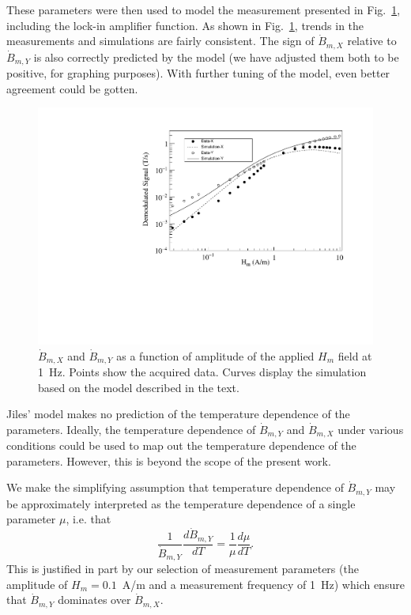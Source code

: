 These parameters were then used to model the measurement presented in
Fig.~\ref{fig:data_and_simulation}, including the lock-in amplifier
function.  As shown in Fig.~\ref{fig:data_and_simulation}, trends in
the measurements and simulations are fairly consistent.  The sign of
$\dot{B}_{m,X}$ relative to $\dot{B}_{m,Y}$ is also correctly
predicted by the model (we have adjusted them both to be positive, for
graphing purposes).  With further tuning of the model, even better
agreement could be gotten.

\begin{figure}[h!]
  \begin{center}
    \includegraphics[width=\textwidth]{Jiles_and_data.pdf}
    \caption{$\dot{B}_{m,X}$ and $\dot{B}_{m,Y}$ as a function of
      amplitude of the applied $H_m$ field at 1~Hz.  Points show the
      acquired data.  Curves display the simulation based on the model
      described in the text.}
    \label{fig:data_and_simulation}
  \end{center}
\end{figure} 

Jiles' model makes no prediction of the temperature dependence of the
parameters.  Ideally, the temperature dependence of $\dot{B}_{m,Y}$
and $\dot{B}_{m,X}$ under various conditions could be used to map out
the temperature dependence of the parameters.  However, this is beyond
the scope of the present work.

We make the simplifying assumption that temperature dependence of
$\dot{B}_{m,Y}$ may be approximately interpreted as the temperature
dependence of a single parameter $\mu$, i.e. that
\begin{equation}
\frac{1}{\dot{B}_{m,Y}}\frac{d\dot{B}_{m,Y}}{dT}=\frac{1}{\mu}\frac{d\mu}{dT}.
\end{equation}
This is justified in part by our selection of measurement parameters
(the amplitude of $H_m=0.1$~A/m and a measurement frequency of 1~Hz)
which ensure that $\dot{B}_{m,Y}$ dominates over $\dot{B}_{m,X}$.

